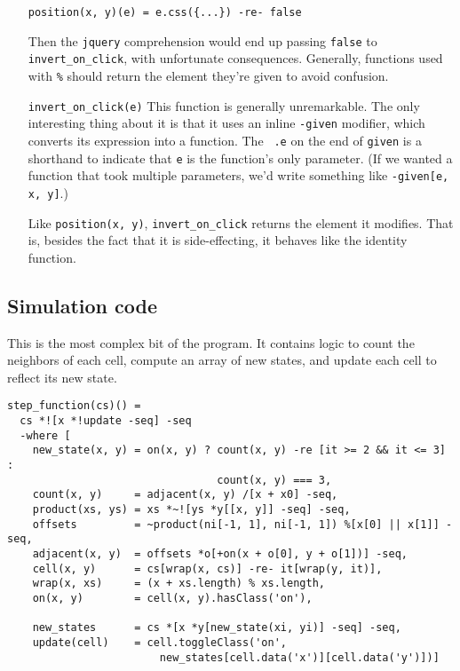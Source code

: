 \documentclass{report}
\begin{document}
\begin{enumerate}
\begin{verbatim}
position(x, y)(e) = e.css({...}) -re- false
\end{verbatim}

  Then the {\tt jquery} comprehension would end up passing {\tt false} to \verb|invert_on_click|, with unfortunate consequences. Generally, functions used with \verb|%| should return
  the element they're given to avoid confusion.

\item[{\tt invert\_on\_click(e)}]
  This function is generally unremarkable. The only interesting thing about it is that it uses an inline {\tt -given} modifier, which converts its expression into a function. The {\tt
  .e} on the end of {\tt given} is a shorthand to indicate that {\tt e} is the function's only parameter. (If we wanted a function that took multiple parameters, we'd write something
  like {\tt -given[e, x, y]}.)

  Like {\tt position(x, y)}, \verb|invert_on_click| returns the element it modifies. That is, besides the fact that it is side-effecting, it behaves like the identity function.
\end{enumerate}

\subsection{Simulation code}
      This is the most complex bit of the program. It contains logic to count the neighbors of each cell, compute an array of new states, and update each cell to reflect its new state.

\begin{verbatim}
step_function(cs)() =
  cs *![x *!update -seq] -seq
  -where [
    new_state(x, y) = on(x, y) ? count(x, y) -re [it >= 2 && it <= 3] :
                                 count(x, y) === 3,
    count(x, y)     = adjacent(x, y) /[x + x0] -seq,
    product(xs, ys) = xs *~![ys *y[[x, y]] -seq] -seq,
    offsets         = ~product(ni[-1, 1], ni[-1, 1]) %[x[0] || x[1]] -seq,
    adjacent(x, y)  = offsets *o[+on(x + o[0], y + o[1])] -seq,
    cell(x, y)      = cs[wrap(x, cs)] -re- it[wrap(y, it)],
    wrap(x, xs)     = (x + xs.length) % xs.length,
    on(x, y)        = cell(x, y).hasClass('on'),

    new_states      = cs *[x *y[new_state(xi, yi)] -seq] -seq,
    update(cell)    = cell.toggleClass('on',
                        new_states[cell.data('x')][cell.data('y')])]
\end{verbatim}
\end{document}
